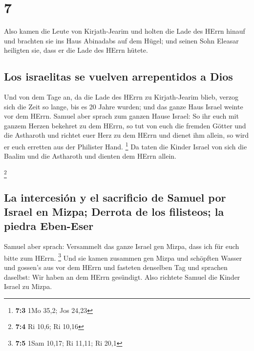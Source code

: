 \hypertarget{section-6}{%
\section{7}\label{section-6}}

 Also kamen die Leute von Kirjath-Jearim und holten die
Lade des HErrn hinauf und brachten sie ins Haus Abinadabs auf dem Hügel;
und seinen Sohn Eleasar heiligten sie, dass er die Lade des HErrn
hütete.

\hypertarget{los-israelitas-se-vuelven-arrepentidos-a-dios}{%
\subsection{Los israelitas se vuelven arrepentidos a
Dios}\label{los-israelitas-se-vuelven-arrepentidos-a-dios}}

 Und von dem Tage an, da die Lade des HErrn zu
Kirjath-Jearim blieb, verzog sich die Zeit so lange, bis es 20 Jahre
wurden; und das ganze Haus Israel weinte vor dem HErrn. 
Samuel aber sprach zum ganzen Hause Israel: So ihr euch mit ganzem
Herzen bekehret zu dem HErrn, so tut von euch die fremden Götter und die
Astharoth und richtet euer Herz zu dem HErrn und dienet ihm allein, so
wird er euch erretten aus der Philister Hand. \footnote{\textbf{7:3} 1Mo
  35,2; Jos 24,23}  Da taten die Kinder Israel von sich
die Baalim und die Astharoth und dienten dem HErrn allein.

\footnote{\textbf{7:4} Ri 10,6; Ri 10,16}

\hypertarget{la-intercesiuxf3n-y-el-sacrificio-de-samuel-por-israel-en-mizpa-derrota-de-los-filisteos-la-piedra-eben-eser}{%
\subsection{La intercesión y el sacrificio de Samuel por Israel en
Mizpa; Derrota de los filisteos; la piedra
Eben-Eser}\label{la-intercesiuxf3n-y-el-sacrificio-de-samuel-por-israel-en-mizpa-derrota-de-los-filisteos-la-piedra-eben-eser}}

 Samuel aber sprach: Versammelt das ganze Israel gen
Mizpa, dass ich für euch bitte zum HErrn. \footnote{\textbf{7:5} 1Sam
  10,17; Ri 11,11; Ri 20,1}  Und sie kamen zusammen gen
Mizpa und schöpften Wasser und gossen's aus vor dem HErrn und fasteten
denselben Tag und sprachen daselbst: Wir haben an dem HErrn gesündigt.
Also richtete Samuel die Kinder Israel zu Mizpa.

